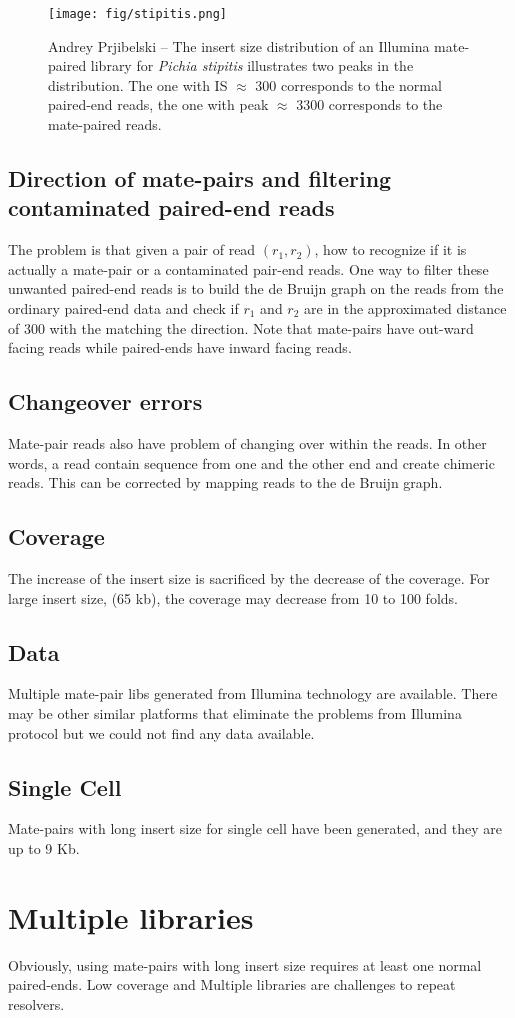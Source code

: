 \documentclass[letterpaper,11pt]{amsart}
\begin{document}
   \begin{figure}
\texttt{[image: fig/stipitis.png]}
\caption{Andrey Prjibelski -- The insert size distribution of an Illumina mate-paired library for \emph{Pichia stipitis} illustrates two peaks in the distribution. The one with IS $\approx$ 300 corresponds to the normal paired-end reads,
    the one with peak $\approx$ 3300 corresponds to  the mate-paired  reads. }
\label{fig:bimodal}
\end{figure}


\subsection*{Direction of mate-pairs and filtering contaminated paired-end reads}
The problem is that given a pair of read $(r_1,r_2)$, how to recognize if it is actually a mate-pair or a contaminated pair-end reads. One way to filter these unwanted paired-end reads is to build the de Bruijn graph 
on the reads from the ordinary paired-end data and check if $r_1$ and $r_2$ are in the approximated distance of $300$ with the matching the direction. Note that mate-pairs have out-ward facing reads while
paired-ends have inward facing reads.
\subsection*{Changeover errors}

Mate-pair reads also have problem of changing over within the reads. In other words, a read contain sequence from one and the other end and create chimeric reads. This can be corrected by mapping reads to the de Bruijn graph.

\subsection*{Coverage}

The increase of the insert size is sacrificed by the decrease of the coverage. For large insert size, (65 kb), the coverage may decrease from 10 to 100 folds. 
\subsection*{Data} Multiple mate-pair libs generated from Illumina technology are available. There may be other similar platforms that eliminate the problems from Illumina protocol but we could not find any data available.

\subsection*{Single Cell}
Mate-pairs with long insert size for single cell have been generated, and they are up to 9 Kb. 

\section{Multiple libraries}
Obviously, using mate-pairs with long insert size requires at least one normal paired-ends. Low coverage and Multiple libraries are challenges to repeat resolvers.


\end{document}
